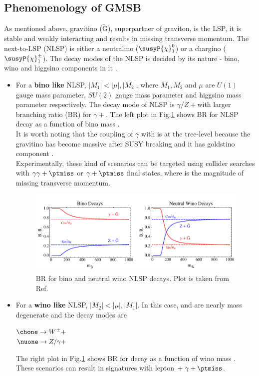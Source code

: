 \subsection{Phenomenology of GMSB}
As mentioned above, gravitino ($\tilde{\mathrm{G}}$), superpartner of graviton, is the LSP, it is stable and weakly interacting and 
results in missing transverse momentum. The next-to-LSP (NLSP) is either a neutralino ($\susyP{\chi}_{1}^{0}$) or a chargino 
($\susyP{\chi}_{1}^{\pm}$). The decay modes of the NLSP is decided by its nature - bino, wino and higgsino components in it 
\cite{Knapen:2016exe}.
\begin{itemize}
\item For a \textbf{bino like} NLSP, $|M_1| < |\mu|, |M_2|$, where $M_1, M_2$ and $\mu$ are $U(1)$ gauge mass parameter, $SU(2)$ gauge 
mass parameter and higgsino mass parameter respectively. The decay mode of NLSP is $\gamma/Z +$\grav with larger branching ratio (BR) for  
$\gamma +$\grav. The left plot in Fig.\ref{fig:NLSPwinoBinoBR} shows BR for NLSP decay as a function of bino mass \cite{Ruderman:2011vv}.\\
It is worth noting that the coupling of $\gamma$ with  is at the tree-level because the gravitino has become massive 
after SUSY breaking and it has goldstino component \cite{Martin:1997ns}.\\
Experimentally, these kind of scenarios can be targeted using collider searches with $\gamma\gamma+\ptmiss$ or $\gamma+\ptmiss$ final 
states, where \ptmiss is the magnitude of missing transverse momentum.

\begin{figure}[h!]
\centering
\includegraphics[width=0.8\linewidth]{../Figures/Chap1/NLSPwinoBinoBR}
\caption[BR for bino and neutral wino NLSP decays]{BR for bino and neutral wino NLSP decays. Plot is taken from Ref.\cite{Ruderman:2011vv}}
\label{fig:NLSPwinoBinoBR}
\end{figure}

\item For a \textbf{wino like} NLSP, $|M_2| < |\mu|, |M_1|$. In this case, \nuone and \chone are nearly mass degenerate and the decay 
modes are
\begin{center}
$\chone \rightarrow W^\pm + $\grav \\%
$\nuone \rightarrow Z/\gamma + $\grav
\end{center}
The right plot in Fig.\ref{fig:NLSPwinoBinoBR} shows BR for \nuone decay as a function of wino mass \cite{Ruderman:2011vv}. These 
scenarios can result in signatures with lepton $+\ \gamma+\ptmiss$.


\end{itemize}
